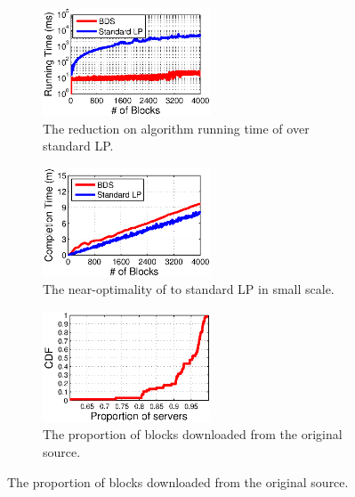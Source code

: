 \begin{figure}[t]
        \centering
        \begin{subfigure}[b]{0.3\textwidth}
                \centering
                \includegraphics[width=50mm]{images/BDSvsLP_v2.eps} %
                \caption{The reduction on algorithm running time of \name over standard LP.}
                \label{fig:further:BDSvsLP}
        \end{subfigure}
        \begin{subfigure}[b]{0.3\textwidth}
                \centering
                \includegraphics[width=50mm]{images/BDSvsLP_CT.eps}%
                \caption{The near-optimality of \name to standard LP in small scale.}
                \label{fig:further:BDSvsLP_CT}
        \end{subfigure}
        \begin{subfigure}[b]{0.3\textwidth}
                \centering
                \includegraphics[width=50mm]{images/overlay.eps}
                \caption{The proportion of blocks downloaded from the original source.}
                \label{fig:further:overlay}
        \end{subfigure}
        \label{fig:further}
\vspace{-0.4cm}
\end{figure}

